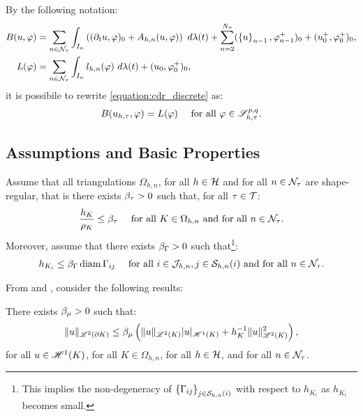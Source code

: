 By the following notation:
\begin{align}
    B(u, \varphi) &= \sum_{n \in \mathcal{N}_{\tau}} \int_{I_n} \left( (\partial_t u, \varphi )_0 + A_{h, n}(u, \varphi) \right) ~ d \lambda(t) + \sum_{n = 2}^{N_{\tau}} (\left\{ u \right\}_{n - 1}, \varphi_{n - 1}^+ )_0 + (u_0^+, \varphi_0^+ )_0, \label{equation:cdr_B} \\
    L(\varphi) &= \sum_{n \in \mathcal{N}_{\tau}} \int_{I_n} l_{h, n}(\varphi) ~ d \lambda(t) + (u_0, \varphi_0^+ )_0 \label{equation:cdr_L},
\end{align}
it is possibile to rewrite \eqref{equation:cdr_discrete} as:
\begin{gather}
    B(u_{h, \tau}, \varphi) = L(\varphi) \quad \text{ for all } \varphi \in \mathscr{S}_{h, \tau}^{p, q}. \label{equation:cdr_discrete_short}
\end{gather}

\newpage
\subsection{Assumptions and Basic Properties}

Assume that all triangulations $\Omega_{h, n}$, for all $h \in \mathcal{H}$ and for all $n \in \mathcal{N}_{\tau}$ are shape-regular, that is there exists $\beta_{\tau} > 0$ such that, for all $\tau \in \mathcal{T}$:
\begin{gather}
    \frac{h_K}{\rho_K} \leq \beta_{\tau} \quad \text{ for all } K \in \Omega_{h, n} \text{ and for all } n \in \mathcal{N}_{\tau}.
\end{gather}
Moreover, assume that there exists $\beta_{\Gamma} > 0$ such that\footnote{This implies the non-degeneracy of $\left\{ \Gamma_{ij} \right\}_{j \in \mathcal{S}_{h, n}(i)}$ with respect to $h_{K_i}$ as $h_{K_i}$ becomes small.}:
\begin{gather}
    h_{K_i} \leq \beta_{\Gamma} \operatorname*{diam} \Gamma_{ij} \quad \text{ for all } i \in \mathcal{J}_{h, n}, j \in \mathcal{S}_{h, n}(i) \text{ and for all } n \in \mathcal{N}_{\tau}.
\end{gather}

From \cite{Dolejší2002} and \cite{Ciarlet1978}, consider the following results:

\begin{lemma}
    There exists $\beta_{\mu} > 0$ such that:
    \begin{gather}
        \lVert u \rVert_{\mathscr{L}^{2}(\partial K)} \leq \beta_{\mu} \left( \lVert u \rVert_{\mathscr{L}^{2}(K)} \lvert u \rvert_{\mathscr{H}^{1}(K)} + h_K^{-1} \lVert u \rVert_{\mathscr{L}^{2}(K)}^2 \right),
    \end{gather}
    for all $u \in \mathscr{H}^{1}(K)$, for all $K \in \Omega_{h, n}$, for all $h \in \mathcal{H}$, and for all $n \in \mathcal{N}_{\tau}$.
\end{lemma}

